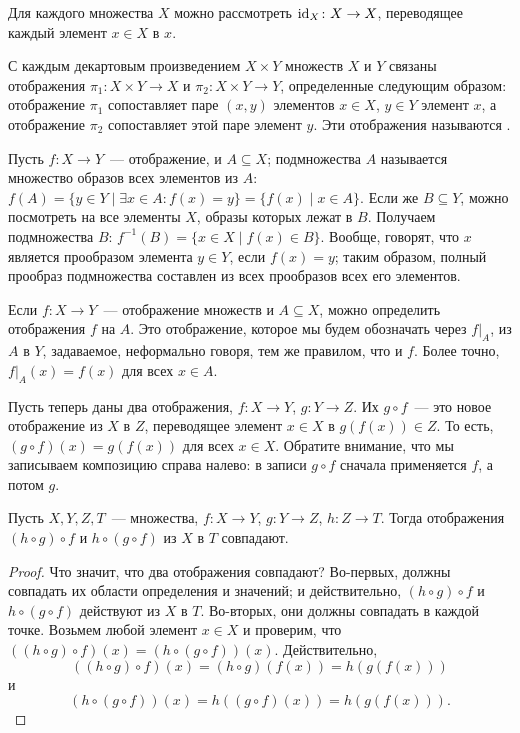 Для каждого множества $X$ можно рассмотреть  $\operatorname{id}_X\colon X\to X$,
переводящее каждый элемент $x\in X$ в $x$.

С каждым декартовым произведением $X\times Y$ множеств $X$ и $Y$
связаны отображения $\pi_1\colon X\times Y\to X$ и $\pi_2\colon
X\times Y\to Y$, определенные следующим образом: отображение $\pi_1$
сопоставляет паре $(x,y)$ элементов $x\in X$, $y\in Y$ элемент $x$, а
отображение $\pi_2$ сопоставляет этой паре элемент $y$. Эти
отображения называются .

Пусть $f\colon X\to Y$~--- отображение, и $A\subseteq X$;
 подмножества $A$ называется
множество образов всех элементов из $A$: $f(A)=\{y\in Y\mid \exists
x\in A\colon f(x)=y\}=\{f(x)\mid x\in A\}$. Если же $B\subseteq Y$,
можно посмотреть на все элементы $X$, образы которых лежат в
$B$. Получаем  подмножества $B$:
$f^{-1}(B)=\{x\in X\mid f(x)\in B\}$. Вообще, говорят, что $x$
является прообразом элемента $y\in Y$, если $f(x)=y$; таким образом,
полный прообраз подмножества составлен из всех прообразов всех его
элементов.


Если $f\colon X\to Y$~--- отображение множеств и $A\subseteq X$, можно
определить  отображения $f$ на
$A$. Это отображение,
которое мы будем обозначать через $f|_A$, из $A$ в $Y$, задаваемое,
неформально говоря, тем же правилом, что и $f$. Более точно,
$f|_A(x)=f(x)$ для всех $x\in A$.

Пусть теперь даны два отображения, $f\colon X\to Y$, $g\colon Y\to
Z$. Их  $g\circ f$~--- это новое
отображение из $X$ в
$Z$, переводящее элемент $x\in X$ в $g(f(x))\in Z$. То есть, $(g\circ
f)(x)=g(f(x))$ для всех $x\in X$. Обратите внимание, что мы записываем
композицию справа налево: в записи $g\circ f$ сначала применяется $f$,
а потом $g$.

\begin{theorem}\label{thm_composition_associative}
Пусть $X,Y,Z,T$~--- множества, $f\colon X\to Y$, $g\colon Y\to Z$,
$h\colon Z\to T$. Тогда отображения $(h\circ g)\circ f$ и $h\circ
(g\circ f)$ из $X$ в $T$ совпадают.
\end{theorem}
\begin{proof}
Что значит, что два отображения совпадают? Во-первых, должны совпадать
их области определения и значений; и действительно, $(h\circ g)\circ
f$ и $h\circ (g\circ f)$ действуют из $X$ в $T$. Во-вторых, они должны
совпадать в каждой точке. Возьмем любой элемент $x\in X$ и проверим,
что $((h\circ g)\circ f)(x)=(h\circ (g\circ f))(x)$. Действительно,
$$((h\circ g)\circ f)(x)=(h\circ g)(f(x))=h(g(f(x)))$$
и
$$(h\circ(g\circ f))(x)=h((g\circ f)(x))=h(g(f(x))).$$
\end{proof}

